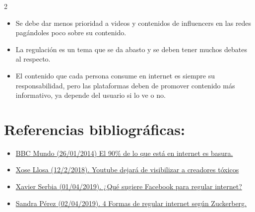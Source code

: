 \documentclass[12pt,spanish,Letterpaper,openany]{book}
\begin{document}
\begin {multicols}{2}
\begin{itemize}
\item
  Se debe dar menos prioridad a videos y contenidos de influencers en las redes pagándoles poco sobre su contenido.
\item
  La regulación es un tema que se da abasto y se deben tener muchos debates al respecto.
\item
  El contenido que cada persona consume en internet es siempre su responsabilidad, pero las plataformas deben de promover contenido más informativo, ya depende del usuario si lo ve o no.
\end{itemize}

\hypertarget{referencias-bibliograficas-13}{%
\section{Referencias bibliográficas:}\label{referencias-bibliograficas-13}}

\begin{itemize}
\item
  \href{https://www.bbc.com/mundo/noticias/2014/01/140122_internet_leyes_reglas_finde}{BBC Mundo (26/01/2014) El 90\% de lo que está en internet es basura.}
\item
  \href{https://as.com/meristation/2018/02/12/noticias/1518448140_173090.html}{Xose Llosa (12/2/2018). Youtube dejará de visibilizar a creadores tóxicos}
\item
  \href{https://cnnespanol.cnn.com/video/sugerencia-facebook-regulacion-internet-mark-\%20zuckerberg-pedido-gobiernos-controles-internet-proteccion-datos-serbia-dinero/}{Xavier Serbia (01/04/2019). ¿Qué sugiere Facebook para regular internet?}
\item
  \href{https://www.fortuneenespanol.com/tecnologia/regular-internet-zuckerberg/}{Sandra Pérez (02/04/2019). 4 Formas de regular internet según Zuckerberg.}
\end{itemize}

\end {multicols}
\end{document}
